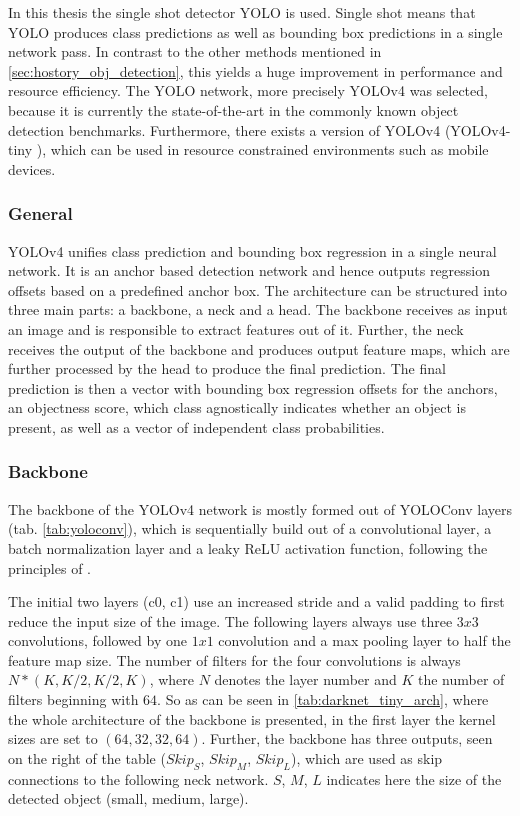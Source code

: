
In this thesis the single shot detector \ac{YOLO} \cite{yolov1} is used.
Single shot means that \ac{YOLO} produces class predictions as well as bounding box predictions in a single network pass.
In contrast to the other methods mentioned in \ref{sec:hostory_obj_detection}, this yields a huge improvement in performance and resource efficiency.
The \ac{YOLO} network, more precisely \ac{YOLOv4} \cite{yolov4} was selected, because it is currently the state-of-the-art in the commonly known object detection benchmarks.
Furthermore, there exists a version of \ac{YOLOv4} (YOLOv4-tiny \cite{yolov4_tiny}), which can be used in resource constrained environments such as mobile devices.

\subsubsection{General}

\ac{YOLOv4} unifies class prediction and bounding box regression in a single neural network.
It is an anchor based detection network and hence outputs regression offsets based on a predefined anchor box.
The architecture can be structured into three main parts: a backbone, a neck and a head.
The backbone receives as input an image and is responsible to extract features out of it.
Further, the neck receives the output of the backbone and produces output feature maps, which are further processed by the head to produce the final prediction.
The final prediction is then a vector with bounding box regression offsets for the anchors, an objectness score, which class agnostically indicates whether an object is present, as well as a vector of independent class probabilities.

\subsubsection{Backbone}

The backbone of the \ac{YOLOv4} network is mostly formed out of YOLOConv layers (tab. \ref{tab:yoloconv}), which is sequentially build out of a convolutional layer, a batch normalization layer and a leaky \ac{ReLU} activation function, following the principles of \cite{batchnorm}.

The initial two layers (c0, c1) use an increased stride and a valid padding to first reduce the input size of the image.
The following layers always use three $3x3$ convolutions, followed by one $1x1$ convolution and a max pooling layer to half the feature map size.
The number of filters for the four convolutions is always $N * (K, K/2, K/2, K)$, where $N$ denotes the layer number and $K$ the number of filters beginning with $64$.
So as can be seen in \ref{tab:darknet_tiny_arch}, where the whole architecture of the backbone is presented, in the first layer the kernel sizes are set to $(64, 32, 32, 64)$.
Further, the backbone has three outputs, seen on the right of the table ($Skip_S$, $Skip_M$, $Skip_L$), which are used as skip connections to the following neck network.
$S$, $M$, $L$ indicates here the size of the detected object (small, medium, large).



